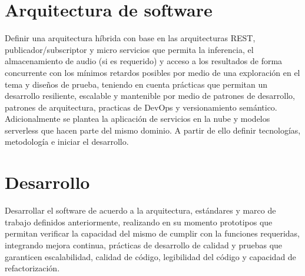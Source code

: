 \section{Arquitectura de software}
Definir una arquitectura híbrida con base en las arquitecturas REST, publicador/subscriptor y micro servicios que permita la inferencia, el almacenamiento de audio (si es requerido) y acceso a los resultados de forma concurrente con los mínimos retardos posibles por medio de una exploración en el tema y diseños de prueba, teniendo en cuenta prácticas que permitan un desarrollo resiliente, escalable y mantenible por medio de patrones de desarrollo, patrones de arquitectura, practicas de DevOps y versionamiento semántico. Adicionalmente se plantea la aplicación de servicios en la nube y modelos serverless que hacen parte del mismo dominio. A partir de ello definir tecnologías, metodología e iniciar el desarrollo.
\section{Desarrollo}
Desarrollar el software de acuerdo a la arquitectura, estándares y marco de trabajo definidos anteriormente, realizando en su momento prototipos que permitan verificar la capacidad del mismo de cumplir con la funciones requeridas, integrando mejora continua, prácticas de desarrollo de calidad y pruebas que garanticen escalabilidad, calidad de código, legibilidad del código y capacidad de refactorización.